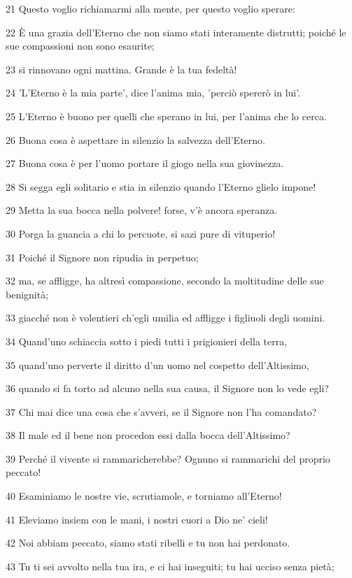\par 21 Questo voglio richiamarmi alla mente, per questo voglio sperare:
\par 22 È una grazia dell'Eterno che non siamo stati interamente distrutti; poiché le sue compassioni non sono esaurite;
\par 23 si rinnovano ogni mattina. Grande è la tua fedeltà!
\par 24 'L'Eterno è la mia parte', dice l'anima mia, 'perciò spererò in lui'.
\par 25 L'Eterno è buono per quelli che sperano in lui, per l'anima che lo cerca.
\par 26 Buona cosa è aspettare in silenzio la salvezza dell'Eterno.
\par 27 Buona cosa è per l'uomo portare il giogo nella sua giovinezza.
\par 28 Si segga egli solitario e stia in silenzio quando l'Eterno glielo impone!
\par 29 Metta la sua bocca nella polvere! forse, v'è ancora speranza.
\par 30 Porga la guancia a chi lo percuote, si sazi pure di vituperio!
\par 31 Poiché il Signore non ripudia in perpetuo;
\par 32 ma, se affligge, ha altresì compassione, secondo la moltitudine delle sue benignità;
\par 33 giacché non è volentieri ch'egli umilia ed affligge i figliuoli degli uomini.
\par 34 Quand'uno schiaccia sotto i piedi tutti i prigionieri della terra,
\par 35 quand'uno perverte il diritto d'un uomo nel cospetto dell'Altissimo,
\par 36 quando si fa torto ad alcuno nella sua causa, il Signore non lo vede egli?
\par 37 Chi mai dice una cosa che s'avveri, se il Signore non l'ha comandato?
\par 38 Il male ed il bene non procedon essi dalla bocca dell'Altissimo?
\par 39 Perché il vivente si rammaricherebbe? Ognuno si rammarichi del proprio peccato!
\par 40 Esaminiamo le nostre vie, scrutiamole, e torniamo all'Eterno!
\par 41 Eleviamo insiem con le mani, i nostri cuori a Dio ne' cieli!
\par 42 Noi abbiam peccato, siamo stati ribelli e tu non hai perdonato.
\par 43 Tu ti sei avvolto nella tua ira, e ci hai inseguiti; tu hai ucciso senza pietà;
